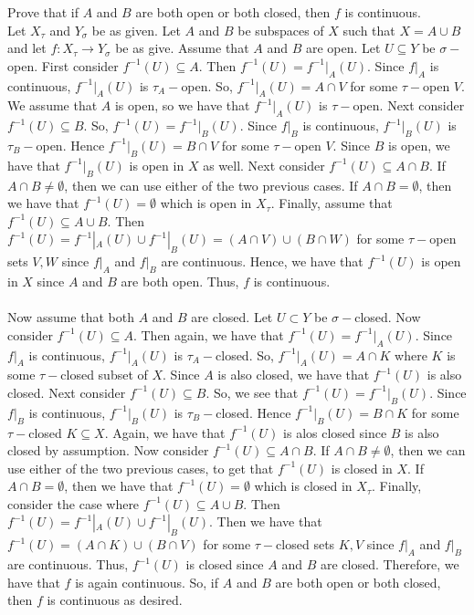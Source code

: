 \documentclass[12pt]{article}
\begin{document}
\begin{enumerate}
Prove that if $A$ and $B$ are both open or both closed, then $f$ is continuous.\\

Let $X_{\tau}$ and $Y_{\sigma}$ be as given. Let $A$ and $B$ be subspaces of $X$ such that $X=A\cup B$ and let $f: X_{\tau}\to Y_{\sigma}$ be as give. Assume that $A$ and $B$ are open. Let $U\subseteq Y$ be $\sigma-$open. First consider $f^{-1}(U)\subseteq A$. Then $f^{-1}(U)=f^{-1}|_A(U)$. Since $f|_A$ is continuous, $f^{-1}|_A(U)$ is $\tau_A-$open. So, $f^{-1}|_A(U)=A\cap V$ for some $\tau-$open $V$. We assume that $A$ is open, so we have that $f^{-1}|_A(U)$ is $\tau-$open. Next consider $f^{-1}(U)\subseteq B$. So, $f^{-1}(U)=f^{-1}|_B(U)$. Since $f|_B$ is continuous, $f^{-1}|_B(U)$ is $\tau_B-$open. Hence $f^{-1}|_B(U)=B\cap V$ for some $\tau-$open $V$. Since $B$ is open, we have that $f^{-1}|_B(U)$ is open in $X$ as well. Next consider $f^{-1}(U)\subseteq A\cap B$. If $A\cap B\neq\emptyset$, then we can use either of the two previous cases. If $A\cap B=\emptyset$, then we have that $f^{-1}(U)=\emptyset$ which is open in $X_\tau$. Finally, assume that $f^{-1}(U)\subseteq A\cup B$. Then $f^{-1}(U)=f^{-1}|_A(U)\cup f^{-1}|_B(U)=(A\cap V)\cup(B\cap W)$ for some $\tau-$open sets $V, W$ since $f|_A$ and $f|_B$ are continuous. Hence, we have that $f^{-1}(U)$ is open in $X$ since $A$ and $B$ are both open. Thus, $f$ is continuous.\\\\
Now assume that both $A$ and $B$ are closed. Let $U\subset Y$ be $\sigma-$closed. Now consider $f^{-1}(U)\subseteq A$. Then again, we have that $f^{-1}(U)=f^{-1}|_A(U)$. Since $f|_A$ is continuous, $f^{-1}|_A(U)$ is $\tau_A-$closed. So, $f^{-1}|_A(U)=A\cap K$ where $K$ is some $\tau-$closed subset of $X$. Since $A$ is also closed, we have that $f^{-1}(U)$ is also closed. Next consider $f^{-1}(U)\subseteq B$. So, we see that $f^{-1}(U)=f^{-1}|_B(U)$. Since $f|_B$ is continuous, $f^{-1}|_B(U)$ is $\tau_B-$closed. Hence $f^{-1}|_B(U)=B\cap K$ for some $\tau-$closed $K\subseteq X$. Again, we have that $f^{-1}(U)$ is alos closed since $B$ is also closed by assumption. Now consider $f^{-1}(U)\subseteq A\cap B$. If $A\cap B\neq\emptyset$, then we can use either of the two previous cases, to get that $f^{-1}(U)$ is closed in $X$. If $A\cap B=\emptyset$, then we have that $f^{-1}(U)=\emptyset$ which is closed in $X_\tau$. Finally, consider the case where $f^{-1}(U)\subseteq A\cup B$. Then $f^{-1}(U)=f^{-1}|_A(U)\cup f^{-1}|_B(U)$. Then we have that $f^{-1}(U)=(A\cap K)\cup (B\cap V)$ for some $\tau-$closed sets $K, V$ since $f|_A$ and $f|_B$ are continuous. Thus, $f^{-1}(U)$ is closed since $A$ and $B$ are closed. Therefore, we have that $f$ is again continuous. So, if $A$ and $B$ are both open or both closed, then $f$ is continuous as desired.


\end{enumerate}
\end{document}
